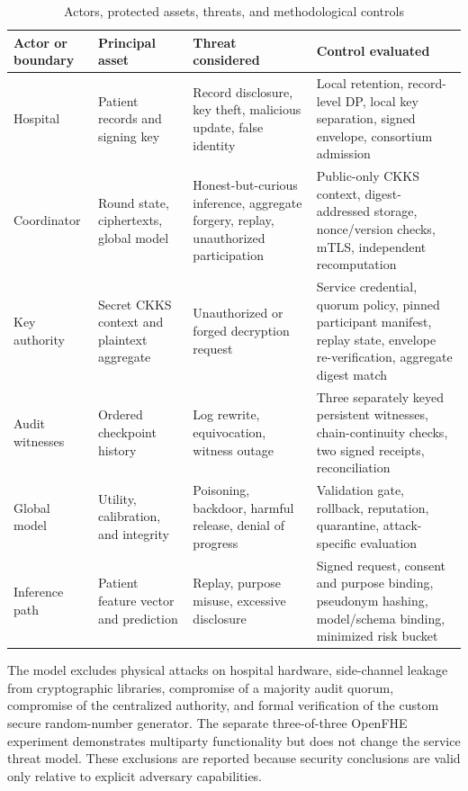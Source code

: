 \begin{table}[htbp]
\centering
\caption{Actors, protected assets, threats, and methodological controls}
\label{tab:threat-controls-method}
\small
\begin{tabularx}{\textwidth}{@{}p{2.4cm}p{3.0cm}X X@{}}
\toprule
Actor or boundary & Principal asset & Threat considered & Control evaluated \\
\midrule
Hospital & Patient records and signing key & Record disclosure, key theft, malicious update, false identity & Local retention, record-level DP, local key separation, signed envelope, consortium admission \\
Coordinator & Round state, ciphertexts, global model & Honest-but-curious inference, aggregate forgery, replay, unauthorized participation & Public-only CKKS context, digest-addressed storage, nonce/version checks, mTLS, independent recomputation \\
Key authority & Secret CKKS context and plaintext aggregate & Unauthorized or forged decryption request & Service credential, quorum policy, pinned participant manifest, replay state, envelope re-verification, aggregate digest match \\
Audit witnesses & Ordered checkpoint history & Log rewrite, equivocation, witness outage & Three separately keyed persistent witnesses, chain-continuity checks, two signed receipts, reconciliation \\
Global model & Utility, calibration, and integrity & Poisoning, backdoor, harmful release, denial of progress & Validation gate, rollback, reputation, quarantine, attack-specific evaluation \\
Inference path & Patient feature vector and prediction & Replay, purpose misuse, excessive disclosure & Signed request, consent and purpose binding, pseudonym hashing, model/schema binding, minimized risk bucket \\
\bottomrule
\end{tabularx}
\end{table}

The model excludes physical attacks on hospital hardware, side-channel leakage from cryptographic libraries, compromise of a majority audit quorum, compromise of the centralized authority, and formal verification of the custom secure random-number generator. The separate three-of-three OpenFHE experiment demonstrates multiparty functionality but does not change the service threat model. These exclusions are reported because security conclusions are valid only relative to explicit adversary capabilities.

